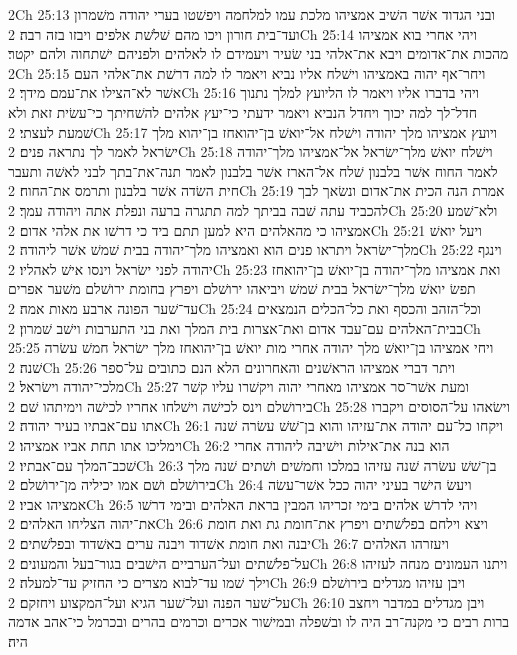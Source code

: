 2Ch 25:13  ובני הגדוד אשׁר השׁיב אמציהו מלכת עמו למלחמה ויפשׁטו בערי יהודה משׁמרון ועד־בית חורון ויכו מהם שׁלשׁת אלפים ויבזו בזה רבה׃
2Ch 25:14  ויהי אחרי בוא אמציהו מהכות את־אדומים ויבא את־אלהי בני שׂעיר ויעמידם לו לאלהים ולפניהם ישׁתחוה ולהם יקטר׃
2Ch 25:15  ויחר־אף יהוה באמציהו וישׁלח אליו נביא ויאמר לו למה דרשׁת את־אלהי העם אשׁר לא־הצילו את־עמם מידך׃
2Ch 25:16  ויהי בדברו אליו ויאמר לו הליועץ למלך נתנוך חדל־לך למה יכוך ויחדל הנביא ויאמר ידעתי כי־יעץ אלהים להשׁחיתך כי־עשׂית זאת ולא שׁמעת לעצתי׃
2Ch 25:17  ויועץ אמציהו מלך יהודה וישׁלח אל־יואשׁ בן־יהואחז בן־יהוא מלך ישׂראל לאמר לך נתראה פנים׃
2Ch 25:18  וישׁלח יואשׁ מלך־ישׂראל אל־אמציהו מלך־יהודה לאמר החוח אשׁר בלבנון שׁלח אל־הארז אשׁר בלבנון לאמר תנה־את־בתך לבני לאשׁה ותעבר חית השׂדה אשׁר בלבנון ותרמס את־החוח׃
2Ch 25:19  אמרת הנה הכית את־אדום ונשׂאך לבך להכביד עתה שׁבה בביתך למה תתגרה ברעה ונפלת אתה ויהודה עמך׃
2Ch 25:20  ולא־שׁמע אמציהו כי מהאלהים היא למען תתם ביד כי דרשׁו את אלהי אדום׃
2Ch 25:21  ויעל יואשׁ מלך־ישׂראל ויתראו פנים הוא ואמציהו מלך־יהודה בבית שׁמשׁ אשׁר ליהודה׃
2Ch 25:22  וינגף יהודה לפני ישׂראל וינסו אישׁ לאהליו׃
2Ch 25:23  ואת אמציהו מלך־יהודה בן־יואשׁ בן־יהואחז תפשׂ יואשׁ מלך־ישׂראל בבית שׁמשׁ ויביאהו ירושׁלם ויפרץ בחומת ירושׁלם משׁער אפרים עד־שׁער הפונה ארבע מאות אמה׃
2Ch 25:24  וכל־הזהב והכסף ואת כל־הכלים הנמצאים בבית־האלהים עם־עבד אדום ואת־אצרות בית המלך ואת בני התערבות וישׁב שׁמרון׃
2Ch 25:25  ויחי אמציהו בן־יואשׁ מלך יהודה אחרי מות יואשׁ בן־יהואחז מלך ישׂראל חמשׁ עשׂרה שׁנה׃
2Ch 25:26  ויתר דברי אמציהו הראשׁנים והאחרונים הלא הנם כתובים על־ספר מלכי־יהודה וישׂראל׃
2Ch 25:27  ומעת אשׁר־סר אמציהו מאחרי יהוה ויקשׁרו עליו קשׁר בירושׁלם וינס לכישׁה וישׁלחו אחריו לכישׁה וימיתהו שׁם׃
2Ch 25:28  וישׂאהו על־הסוסים ויקברו אתו עם־אבתיו בעיר יהודה׃
2Ch 26:1  ויקחו כל־עם יהודה את־עזיהו והוא בן־שׁשׁ עשׂרה שׁנה וימליכו אתו תחת אביו אמציהו׃
2Ch 26:2  הוא בנה את־אילות וישׁיבה ליהודה אחרי שׁכב־המלך עם־אבתיו׃
2Ch 26:3  בן־שׁשׁ עשׂרה שׁנה עזיהו במלכו וחמשׁים ושׁתים שׁנה מלך בירושׁלם ושׁם אמו יכיליה מן־ירושׁלם׃
2Ch 26:4  ויעשׂ הישׁר בעיני יהוה ככל אשׁר־עשׂה אמציהו אביו׃
2Ch 26:5  ויהי לדרשׁ אלהים בימי זכריהו המבין בראת האלהים ובימי דרשׁו את־יהוה הצליחו האלהים׃
2Ch 26:6  ויצא וילחם בפלשׁתים ויפרץ את־חומת גת ואת חומת יבנה ואת חומת אשׁדוד ויבנה ערים באשׁדוד ובפלשׁתים׃
2Ch 26:7  ויעזרהו האלהים על־פלשׁתים ועל־הערביים הישׁבים בגור־בעל והמעונים׃
2Ch 26:8  ויתנו העמונים מנחה לעזיהו וילך שׁמו עד־לבוא מצרים כי החזיק עד־למעלה׃
2Ch 26:9  ויבן עזיהו מגדלים בירושׁלם על־שׁער הפנה ועל־שׁער הגיא ועל־המקצוע ויחזקם׃
2Ch 26:10  ויבן מגדלים במדבר ויחצב ברות רבים כי מקנה־רב היה לו ובשׁפלה ובמישׁור אכרים וכרמים בהרים ובכרמל כי־אהב אדמה היה׃
